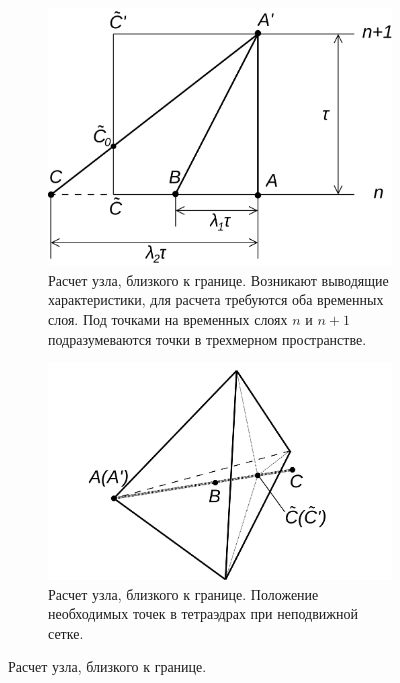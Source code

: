 \begin{figure}[htp]
\centering
\begin{subfigure}[b]{0.6\textwidth}
\centering
\includegraphics[width=\textwidth]{png/characteristics-2d-triangles-semi-border-1.png}
\caption{Расчет узла, близкого к границе. Возникают выводящие характеристики, для расчета требуются оба временных слоя. Под точками на временных слоях $n$ и $n+1$ подразумеваются точки в трехмерном пространстве.}
\end{subfigure}
\begin{subfigure}[b]{0.6\textwidth}
\centering
\includegraphics[width=\textwidth]{png/characteristics-2d-triangles-semi-border-2.png}
\caption{Расчет узла, близкого к границе. Положение необходимых точек в тетраэдрах при неподвижной сетке.}
\end{subfigure}
\caption{Расчет узла, близкого к границе.}
\label{pic:near_border_node}
\end{figure}

